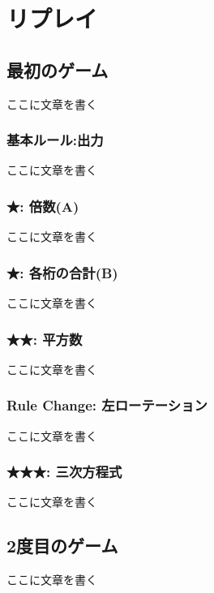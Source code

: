 \documentclass[index]{subfiles}
\begin{document}
  \chapter{リプレイ}
  \label{ch:second}

  \section{最初のゲーム}
  \label{sec:replay_first}

  ここに文章を書く

  \subsection{基本ルール:出力}

  ここに文章を書く

  \subsection{★: 倍数(A)}

  ここに文章を書く

  \subsection{★: 各桁の合計(B)}

  ここに文章を書く


  \subsection{★★: 平方数}

  ここに文章を書く

  \subsection{Rule Change: 左ローテーション}

  ここに文章を書く

  \subsection{★★★: 三次方程式}

  ここに文章を書く

  \section{2度目のゲーム}
  \label{sec:replay_second}

  ここに文章を書く
\end{document}
